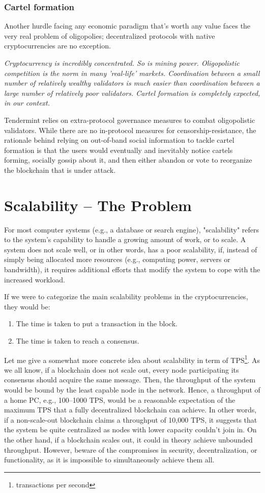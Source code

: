 \documentclass[a4paper]{article}
\begin{document}
	\subsubsection{Cartel formation}
	Another hurdle facing any economic paradigm that’s worth any value faces the very real problem of oligopolies; decentralized protocols with native cryptocurrencies are no exception.
	
	\textit{Cryptocurrency is incredibly concentrated. So is mining power. Oligopolistic competition is the norm in many 'real-life' markets. Coordination between a small number of relatively wealthy validators is much easier than coordination between a large number of relatively poor validators. Cartel formation is completely expected, in our context.}\cite{zamfir2017casper}
	
	Tendermint relies on extra-protocol governance measures to combat oligopolistic validators. While there are no in-protocol measures for censorship-resistance, the rationale behind relying on out-of-band social information to tackle cartel formation is that the users would eventually and inevitably notice cartels forming, socially gossip about it, and then either abandon or vote to reorganize the blockchain that is under attack.
	
	\section{Scalability -- The Problem}
	For most computer systems (e.g., a database or search engine), "scalability" refers to the system’s capability to handle a growing amount of work, or to scale\cite{bondi2000characteristics}. A system does not scale well, or in other words, has a poor scalability, if, instead of simply being allocated more resources (e.g., computing power, servers or bandwidth), it requires additional efforts that modify the system to cope with the increased workload.
	
	If we were to categorize the main scalability problems in the cryptocurrencies, they would be:
	\begin{enumerate}
		\item The time is taken to put a transaction in the block.
		\item The time is taken to reach a consensus.
	\end{enumerate}
	
	Let me give a somewhat more concrete idea about scalability in term of TPS\footnote{transactions per second}. As we all know, if a blockchain does not scale out, every node participating its consensus should acquire the same message. Then, the throughput of the system would be bound by the least capable node in the network. Hence, a throughput of a home PC, e.g., 100–1000 TPS, would be a reasonable expectation of the maximum TPS that a fully decentralized blockchain can achieve. In other words, if a non-scale-out blockchain claims a throughput of 10,000 TPS, it suggests that the system be quite centralized as nodes with lower capacity couldn’t join in. On the other hand, if a blockchain scales out, it could in theory achieve unbounded throughput. However, beware of the compromises in security, decentralization, or functionality, as it is impossible to simultaneously achieve them all.
	
\end{document}
